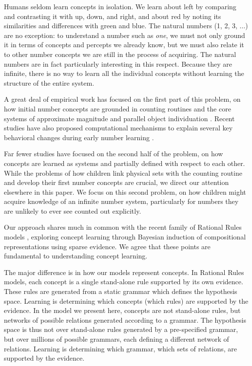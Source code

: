 \documentclass[10pt,letterpaper]{article}
\begin{document}
Humans seldom learn concepts in isolation. We learn about left by
comparing and contrasting it with up, down, and right, and about red
by noting its similarities and differences with green and blue. The
natural numbers (1, 2, 3, $\ldots$) are no exception: to understand a
number such as \emph{one}, we must not only ground it in terms of
concepts and percepts we already know, but we must also relate it to
other number concepts we are still in the process of acquiring. The
natural numbers are in fact particularly interesting in this respect.
Because they are infinite, there is no way to learn all the individual
concepts without learning the structure of the entire system.

A great deal of empirical work has focused on the first part of this
problem, on how initial number concepts are grounded in counting
routines and the core systems of approximate magnitude and parallel
object individuation
\citep{Car2009,dehaene2011number,feigenson2004core}. Recent studies
have also proposed computational mechanisms to explain several key
behavioral changes during early number learning
\citep{PianGoodTen2012}.

Far fewer studies have focused on the second half of the problem, on
how concepts are learned as systems and partially defined with respect
to each other. While the problems of how children link physical sets
with the counting routine and develop their first number concepts are
crucial, we direct our attention elsewhere in this paper. We focus on
this second problem, on how children might acquire knowledge of an
infinite number system, particularly for numbers they are unlikely to
ever see counted out explicitly.

Our approach shares much in common with the recent family of Rational
Rules models
\citep{goodman2008rational,T.D.Ullman:2012:1b1b6,PianGoodTen2012},
exploring concept learning through Bayesian induction of compositional
representations using sparse evidence. We agree that these points are
fundamental to understanding concept learning.

The major difference is in how our models represent concepts. In
Rational Rules models, each concept is a single stand-alone rule
supported by its own evidence. These rules are generated from a static
grammar which defines the hypothesis space. Learning is determining
which concepts (which rules) are supported by the evidence. In the
model we present here, concepts are not stand-alone rules, but
networks of possible relations generated according to a grammar. The
hypothesis space is thus not over stand-alone rules generated by a
pre-specified grammar, but over millions of possible grammars, each
defining a different network of relations. Learning is determining
which grammar, which sets of relations, are supported by the evidence.
\end{document}
